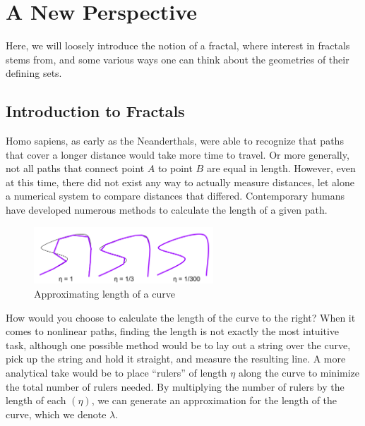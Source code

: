 \chapter{A New Perspective}

\begin{summary}
  Here, we will loosely introduce the notion of a fractal, where interest in fractals stems from, and some various ways one can think about the geometries of their defining sets. 
\end{summary}

\section{Introduction to Fractals}
Homo sapiens, as early as the Neanderthals, were able to recognize that paths that cover a longer distance would take more time to travel. Or more generally, not all paths that connect point $A$ to point $B$ are equal in length. However, even at this time, there did not exist any way to actually measure distances, let alone a numerical system to compare distances that differed. Contemporary humans have developed numerous methods to calculate the length of a given path. \\

\begin{figure}
  \begin{center}
    \includegraphics[width=0.6\textwidth]{Images/1.1.png}
  \end{center}
  \caption{Approximating length of a curve}
\end{figure}

How would you choose to calculate the length of the curve to the right? When it comes to nonlinear paths, finding the length is not exactly the most intuitive task, although one possible method would be to lay out a string over the curve, pick up the string and hold it straight, and measure the resulting line. A more analytical take would be to place ``rulers'' of length $\eta$ along the curve to minimize the total number of rulers needed. By multiplying the number of rulers by the length of each $(\eta)$, we can generate an approximation for the length of the curve, which we denote $\lambda$. \\


